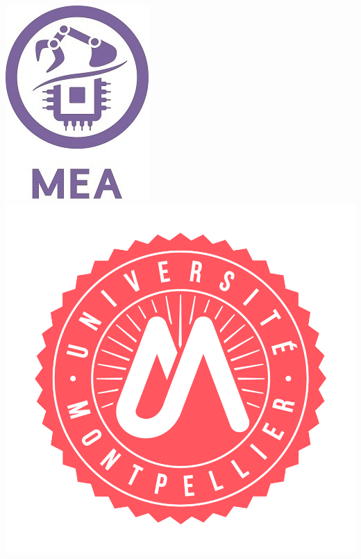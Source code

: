 \begin{titlepage}
    \vspace{2.6cm}
        \includegraphics[height=0.15\textheight]{images/mea.jpg}
        \hfill
        \includegraphics[height=0.15\textheight]{images/um.png}
  \end{titlepage}
\makeatother